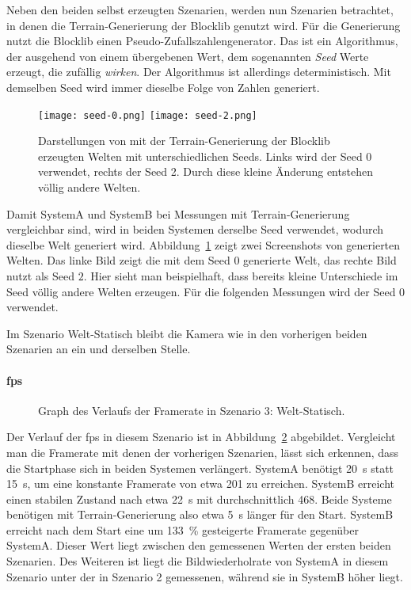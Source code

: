 Neben den beiden selbst erzeugten Szenarien, werden nun Szenarien betrachtet, in denen die Terrain-Generierung der Blocklib genutzt wird. Für die Generierung nutzt die Blocklib einen Pseudo-Zufallszahlengenerator. Das ist ein Algorithmus, der ausgehend von einem übergebenen Wert, dem sogenannten \emph{Seed} Werte erzeugt, die zufällig \emph{wirken}. Der Algorithmus ist allerdings deterministisch. Mit demselben Seed wird immer dieselbe Folge von Zahlen generiert.

\begin{figure}
	\centering
	\texttt{[image: seed-0.png]}
	\hfill
	\texttt{[image: seed-2.png]}
	\caption[Darstellungen von mit der Terrain-Generierung der Blocklib erzeugten Welten mit unterschiedlichen Seeds.]{Darstellungen von mit der Terrain-Generierung der Blocklib erzeugten Welten mit unterschiedlichen Seeds. Links wird der Seed 0 verwendet, rechts der Seed 2. Durch diese kleine Änderung entstehen völlig andere Welten.}\label{fig:static}
\end{figure}
Damit SystemA und SystemB bei Messungen mit Terrain-Generierung vergleichbar sind, wird in beiden Systemen derselbe Seed verwendet, wodurch dieselbe Welt generiert wird. Abbildung~\ref{fig:static} zeigt zwei Screenshots von generierten Welten. Das linke Bild zeigt die mit dem Seed $0$ generierte Welt, das rechte Bild nutzt als Seed $2$. Hier sieht man beispielhaft, dass bereits kleine Unterschiede im Seed völlig andere Welten erzeugen. Für die folgenden Messungen wird der Seed $0$ verwendet. 

Im Szenario Welt-Statisch bleibt die Kamera wie in den vorherigen beiden Szenarien an ein und derselben Stelle.



\paragraph{\ac{fps}}
\begin{figure}[!htbp]
	\caption{Graph des Verlaufs der Framerate in Szenario 3: Welt-Statisch.}\label{fig:seed-0-static-fps}
\end{figure}
Der Verlauf der \ac{fps} in diesem Szenario ist in Abbildung~\ref{fig:seed-0-static-fps} abgebildet. Vergleicht man die Framerate mit denen der vorherigen Szenarien, lässt sich erkennen, dass die Startphase sich in beiden Systemen verlängert. SystemA benötigt \SI{20}{\second} statt \SI{15}{\second}, um eine konstante Framerate von etwa \SI{201}{\fps} zu erreichen. SystemB erreicht einen stabilen Zustand nach etwa \SI{22}{\second} mit durchschnittlich \SI{468}{\fps}.
Beide Systeme benötigen mit Terrain-Generierung also etwa \SI{5}{\second} länger für den Start. SystemB erreicht nach dem Start eine um \SI{133}{\percent} gesteigerte Framerate gegenüber SystemA. Dieser Wert liegt zwischen den gemessenen Werten der ersten beiden Szenarien. Des Weiteren ist liegt die Bildwiederholrate von SystemA in diesem Szenario unter der in Szenario 2 gemessenen, während sie in SystemB höher liegt.

